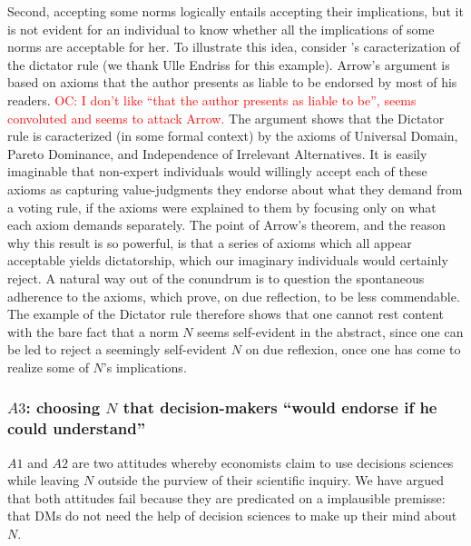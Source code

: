 \documentclass[preprint, french, english, 11pt, authoryear]{elsarticle}%
\newcommand{\protectforpdf}[1]{\texorpdfstring{\ensuremath{#1}}{#1}}
\newcommand{\commentOC}[1]{\textcolor{red}{OC: #1}}
\begin{document}
Second, accepting some norms logically entails accepting their implications, but it is not evident for an individual to know whether all the implications of some norms are acceptable for her. To illustrate this idea, consider \citeauthor{arrow_social_2012}’s \citeyearpar{arrow_social_2012} caracterization of the dictator rule (we thank Ulle Endriss for this example). Arrow's argument is based on axioms that the author presents as liable to be endorsed by most of his readers. \commentOC{I don’t like “that the author presents as liable to be”, seems convoluted and seems to attack Arrow.} The argument shows that the Dictator rule is caracterized (in some formal context) by the axioms of Universal Domain, Pareto Dominance, and Independence of Irrelevant Alternatives. It is easily imaginable that non-expert individuals would willingly accept each of these axioms as capturing value-judgments they endorse about what they demand from a voting rule, if the axioms were explained to them by focusing only on what each axiom demands separately. The point of Arrow's theorem, and the reason why this result is so powerful, is that a series of axioms which all appear acceptable yields dictatorship, which our imaginary individuals would certainly reject. A natural way out of the conundrum is to question the spontaneous adherence to the axioms, which prove, on due reflection, to be less commendable. The example of the Dictator rule therefore shows that one cannot rest content with the bare fact that a norm $N$ seems self-evident in the abstract, since one can be led to reject a seemingly self-evident $N$ on due reflexion, once one has come to realize some of $N$'s implications.

\subsubsection{\protectforpdf{A3}: choosing \protectforpdf{N} that decision-makers ``would endorse if he could understand''}
$A1$ and $A2$ are two attitudes whereby economists claim to use decisions sciences while leaving $N$ outside the purview of their scientific inquiry. We have argued that both attitudes fail because they are predicated on a implausible premisse: that \acp{DM} do not need the help of decision sciences to make up their mind about $N$.
\end{document}
